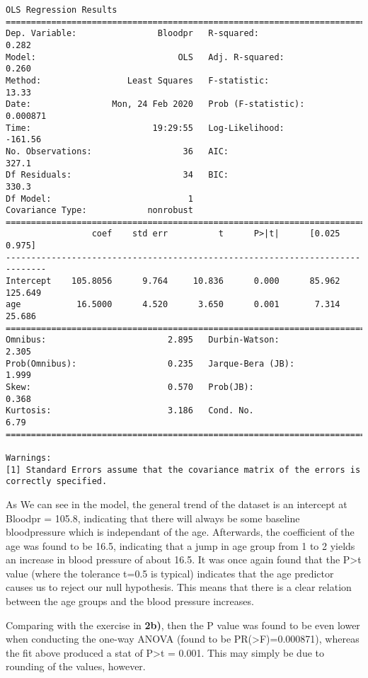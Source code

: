 \documentclass[11pt]{article}
\begin{document}
    \begin{Verbatim}[commandchars=\\\{\}]
                            OLS Regression Results                            
==============================================================================
Dep. Variable:                Bloodpr   R-squared:                       0.282
Model:                            OLS   Adj. R-squared:                  0.260
Method:                 Least Squares   F-statistic:                     13.33
Date:                Mon, 24 Feb 2020   Prob (F-statistic):           0.000871
Time:                        19:29:55   Log-Likelihood:                -161.56
No. Observations:                  36   AIC:                             327.1
Df Residuals:                      34   BIC:                             330.3
Df Model:                           1                                         
Covariance Type:            nonrobust                                         
==============================================================================
                 coef    std err          t      P>|t|      [0.025      0.975]
------------------------------------------------------------------------------
Intercept    105.8056      9.764     10.836      0.000      85.962     125.649
age           16.5000      4.520      3.650      0.001       7.314      25.686
==============================================================================
Omnibus:                        2.895   Durbin-Watson:                   2.305
Prob(Omnibus):                  0.235   Jarque-Bera (JB):                1.999
Skew:                           0.570   Prob(JB):                        0.368
Kurtosis:                       3.186   Cond. No.                         6.79
==============================================================================

Warnings:
[1] Standard Errors assume that the covariance matrix of the errors is correctly specified.

    \end{Verbatim}

    As We can see in the model, the general trend of the dataset is an
intercept at Bloodpr = 105.8, indicating that there will always be some
baseline bloodpressure which is independant of the age. Afterwards, the
coefficient of the age was found to be 16.5, indicating that a jump in
age group from 1 to 2 yields an increase in blood pressure of about
16.5. It was once again found that the
P\textgreater{}\textbar{}t\textbar{} value (where the tolerance t=0.5 is
typical) indicates that the age predictor causes us to reject our null
hypothesis. This means that there is a clear relation between the age
groups and the blood pressure increases.

Comparing with the exercise in \textbf{2b)}, then the P value was found
to be even lower when conducting the one-way ANOVA (found to be
PR(\textgreater{}F)=0.000871), whereas the fit above produced a stat of
P\textgreater{}\textbar{}t\textbar{} = 0.001. This may simply be due to
rounding of the values, however.


    
    
    
    
\end{document}
